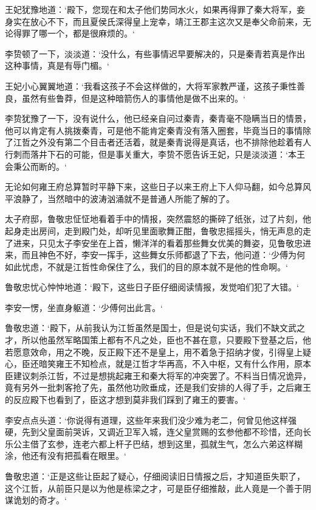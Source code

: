 王妃犹豫地道：‘殿下，您现在和太子他们势同水火，如果再得罪了秦大将军，妾身实在放心不下，而且夏侯氏深得皇上宠幸，靖江王郡主这次又是奉父命前来，无论得罪了哪一个，都是很麻烦的。‘

李贽顿了一下，淡淡道：‘没什么，有些事情迟早要解决的，只是秦青若真是作出这种事情，真是有辱门楣。‘

王妃小心翼翼地道：‘我看这孩子不会这样做的，大将军家教严谨，这孩子秉性善良，虽然有些鲁莽，但是这种暗箭伤人的事情他是做不出来的。‘

李贽犹豫了一下，没有说什么，他已经亲自问过秦青，秦青毫不隐瞒当日的情景，他可以肯定有人挑拨秦青，可是他不能肯定秦青没有落入圈套，毕竟当日的事情除了江哲之外没有第二个目击者还活着，就是秦青说得是真话，也不排除他趁着有人行刺而落井下石的可能，但是事关重大，李贽不愿告诉王妃，只是淡淡道：‘本王会秉公而断的。‘

无论如何雍王府总算暂时平静下来，这些日子以来王府上下人仰马翻，如今总算风平浪静了，当然暗中的波涛汹涌就不是普通人所能了解的了。

太子府邸，鲁敬忠怔怔地看着手中的情报，突然震怒的撕碎了纸张，过了片刻，他起身走出房间，走到殿门处，却听见里面歌舞正酣，鲁敬忠摇摇头，悄无声息的走了进来，只见太子李安坐在上首，懒洋洋的看着那些舞女优美的舞姿，见鲁敬忠进来，而且神色不好，李安一挥手，这些舞女乐师都退了下去，他问道：‘少傅为何如此忧虑，不就是江哲性命保住了么，我们的目的原本就不是他的性命啊。‘

鲁敬忠忧心忡忡地道：‘殿下，这些日子臣仔细阅读情报，发觉咱们犯了大错。‘

李安一愣，坐直身躯道：‘少傅何出此言。‘

鲁敬忠道：‘殿下，从前我认为江哲虽然是国士，但是说句实话，我们不缺文武之才，所以他虽然军略国策上都有不凡之处，臣也不甚在意，只要殿下登基之后，他若愿意效命，用之不晚，反正殿下还不是皇上，用不着急于招纳才俊，引得皇上疑心，臣还暗笑雍王不知检点，就是江哲才华再高，不入中枢，又有什么作用，原本臣建议刺杀江哲，不过是想挑起雍王和秦大将军的冲突罢了。不料当日情况诡异，竟有另外一批刺客抢了先，虽然他功败垂成，还是我们安排的人得了手，之后雍王的反应殿下也看到了，臣这才想到莫非我们踩到了雍王的要害。‘

李安点点头道：‘你说得有道理，这些年来我们没少难为老二，何曾见他这样强硬，先到父皇面前哭诉，又调近卫军入城，连父皇赏赐的玄参他都不珍惜，还向长乐公主借了玄参，连老六都上杆子巴结，想到这里，孤就生气，怎么六弟这样糊涂，他还有没有把孤看在眼里。‘

鲁敬忠道：‘正是这些让臣起了疑心，仔细阅读旧日情报之后，才知道臣失职了，这个江哲，从前臣只是以为他是栋梁之才，可是臣仔细推敲，此人竟是一个善于阴谋诡划的奇才。‘

